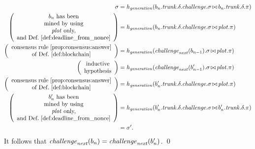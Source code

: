   \begin{align*}
    \sigma&=h_{\mathit{generation}}(b_n.{\mathit{trunk}}.\delta.{\mathit{challenge}}.\sigma\operatorname*{\bowtie} b_n.{\mathit{trunk}}.\delta.\pi)\\
    \left(\begin{array}{c}
      \text{$b_n$ has been}\\
      \text{mined by using}\\
      \text{${\mathit{plot}}$ only,}\\
      \text{and Def.~\ref{def:deadline_from_nonce}}
    \end{array}\right)&=h_{\mathit{generation}}(b_n.{\mathit{trunk}}.\delta.{\mathit{challenge}}.\sigma\operatorname*{\bowtie}{\mathit{plot}}.\pi)\\
    \left(\begin{array}{c}
      \text{consensus rule~\ref{prop:consensus:answer}}\\
      \text{of Def.~\ref{def:blockchain}}
    \end{array}\right)&=h_{\mathit{generation}}({\mathit{challenge}}_{\mathit{next}}(b_{n-1}).\sigma\operatorname*{\bowtie}{\mathit{plot}}.\pi)\\
    \left(\begin{array}{c}
      \text{inductive}\\
      \text{hypothesis}
    \end{array}\right)&=h_{\mathit{generation}}({\mathit{challenge}}_{\mathit{next}}(b'_{n-1}).\sigma\operatorname*{\bowtie}{\mathit{plot}}.\pi)\\
    \left(\begin{array}{c}
      \text{consensus rule~\ref{prop:consensus:answer}}\\
      \text{of Def.~\ref{def:blockchain}}
    \end{array}\right)&=h_{\mathit{generation}}(b'_n.{\mathit{trunk}}.\delta.{\mathit{challenge}}.\sigma\operatorname*{\bowtie}{\mathit{plot}}.\pi)\\
    \left(\begin{array}{c}
      \text{$b'_n$ has been}\\
      \text{mined by using}\\
      \text{${\mathit{plot}}$ only,}\\
      \text{and Def.~\ref{def:deadline_from_nonce}}
    \end{array}\right)&=h_{\mathit{generation}}(b'_n.{\mathit{trunk}}.\delta.{\mathit{challenge}}.\sigma\operatorname*{\bowtie} b'_n.{\mathit{trunk}}.\delta.\pi)\\
    &=\sigma'.
  \end{align*}
  It follows that ${\mathit{challenge}}_{\mathit{next}}(b_n)={\mathit{challenge}}_{\mathit{next}}(b'_n)$.
  \qed
